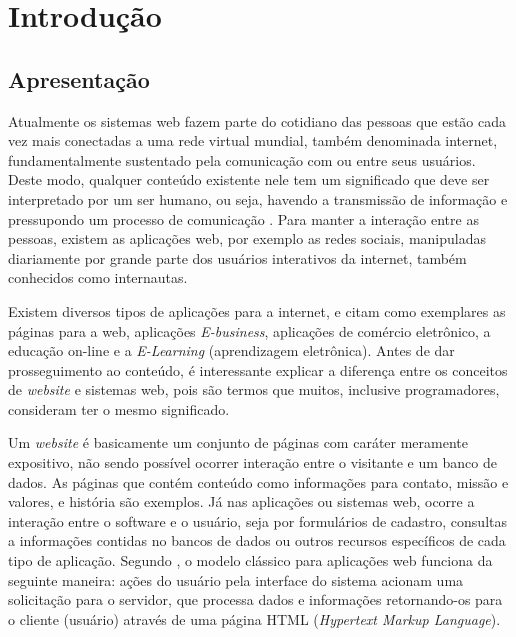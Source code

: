 \newpage
\chapter{Introdução}
\hspace{2.5cm}

\section{Apresentação}
Atualmente os sistemas web fazem parte do cotidiano das pessoas que estão cada vez mais conectadas a uma rede virtual mundial, também denominada internet, fundamentalmente sustentado pela comunicação com ou entre seus usuários.
Deste modo, qualquer conteúdo existente nele tem um significado que deve ser interpretado por um ser humano, ou seja, havendo a transmissão de informação e pressupondo um processo de comunicação \cite{de2012rede}. Para manter a interação entre as pessoas, existem as aplicações web, por exemplo as redes sociais, manipuladas diariamente por grande parte dos usuários interativos da internet, também conhecidos como internautas. 

Existem diversos tipos de aplicações para a internet,  e  citam como exemplares as páginas para a web, aplicações \textit{E-business}, aplicações de comércio eletrônico, a educação on-line e a \textit{E-Learning} (aprendizagem eletrônica). Antes de dar prosseguimento ao conteúdo, é interessante explicar a diferença entre os conceitos de \textit{website} e sistemas web, pois são termos que muitos, inclusive programadores, consideram ter o mesmo significado. 

Um \textit{website} é basicamente um conjunto de páginas com caráter meramente expositivo, não sendo possível ocorrer interação entre o visitante e um banco de dados. As páginas que contém conteúdo como informações para contato, missão e valores, e história são exemplos. Já nas aplicações ou sistemas web, ocorre a interação entre o software e o usuário, seja por formulários de cadastro, consultas a informações contidas no bancos de dados ou outros recursos específicos de cada tipo de aplicação. Segundo , o modelo clássico para aplicações web funciona da seguinte maneira: ações do usuário pela interface do sistema acionam uma solicitação para o servidor, que processa dados e informações retornando-os para o cliente (usuário) através de uma página HTML
(\textit{Hypertext Markup Language}).


